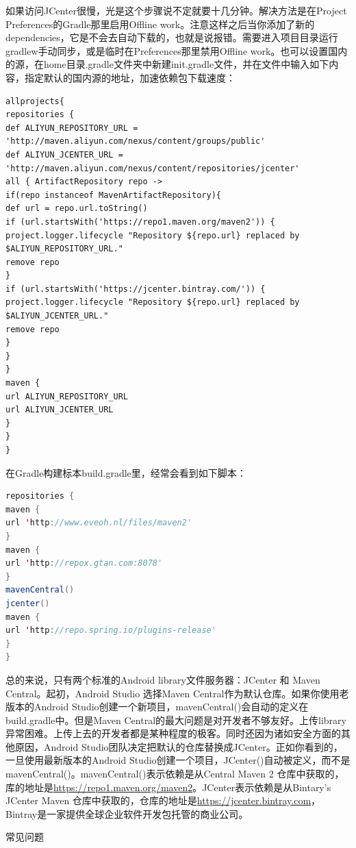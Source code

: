 \documentclass[12pt]{book}
\makeatletter
\numberwithin{dummy}{section}
\theoremstyle{ocrenumbox}
\theoremstyle{blacknumex}
\theoremstyle{blacknumbox}
\theoremstyle{ocrenum}
\renewcommand{\subsection}{\@startsection {subsection}{2}{\z@}
	{-3ex \@plus -0.1ex \@minus -.4ex}
	{0.5ex \@plus.2ex }
	{\normalfont\sffamily\bfseries}}
\makeatother
\begin{document}
如果访问JCenter很慢，光是这个步骤说不定就要十几分钟。解决方法是在Project Preferences的Gradle那里启用Offline work。注意这样之后当你添加了新的dependencies，它是不会去自动下载的，也就是说报错。需要进入项目目录运行gradlew手动同步，或是临时在Preferences那里禁用Offline work。也可以设置国内的源，在home目录.gradle文件夹中新建init.gradle文件，并在文件中输入如下内容，指定默认的国内源的地址，加速依赖包下载速度：

\begin{lstlisting}
allprojects{
repositories {
def ALIYUN_REPOSITORY_URL = 'http://maven.aliyun.com/nexus/content/groups/public'
def ALIYUN_JCENTER_URL = 'http://maven.aliyun.com/nexus/content/repositories/jcenter'
all { ArtifactRepository repo ->
if(repo instanceof MavenArtifactRepository){
def url = repo.url.toString()
if (url.startsWith('https://repo1.maven.org/maven2')) {
project.logger.lifecycle "Repository ${repo.url} replaced by $ALIYUN_REPOSITORY_URL."
remove repo
}
if (url.startsWith('https://jcenter.bintray.com/')) {
project.logger.lifecycle "Repository ${repo.url} replaced by $ALIYUN_JCENTER_URL."
remove repo
}
}
}
maven {
url ALIYUN_REPOSITORY_URL
url ALIYUN_JCENTER_URL
}
}
}
\end{lstlisting}

在Gradle构建标本build.gradle里，经常会看到如下脚本：

\begin{lstlisting}[language=Java]
repositories {
maven {
url 'http://www.eveoh.nl/files/maven2'
}
maven {
url 'http://repox.gtan.com:8078'
}
mavenCentral()
jcenter()
maven { 
url 'http://repo.spring.io/plugins-release' 
}
}
\end{lstlisting}

总的来说，只有两个标准的Android library文件服务器：JCenter 和 Maven Central。起初，Android Studio 选择Maven Central作为默认仓库。如果你使用老版本的Android Studio创建一个新项目，mavenCentral()会自动的定义在build.gradle中。但是Maven Central的最大问题是对开发者不够友好。上传library异常困难。上传上去的开发者都是某种程度的极客。同时还因为诸如安全方面的其他原因，Android Studio团队决定把默认的仓库替换成JCenter。正如你看到的，一旦使用最新版本的Android Studio创建一个项目，JCenter()自动被定义，而不是mavenCentral()。mavenCentral()表示依赖是从Central Maven 2 仓库中获取的，库的地址是\url{https://repo1.maven.org/maven2}。JCenter表示依赖是从Bintary’s JCenter Maven 仓库中获取的，仓库的地址是\url{https://jcenter.bintray.com}，Bintray是一家提供全球企业软件开发包托管的商业公司。

\subsection{常见问题}
\end{document}
